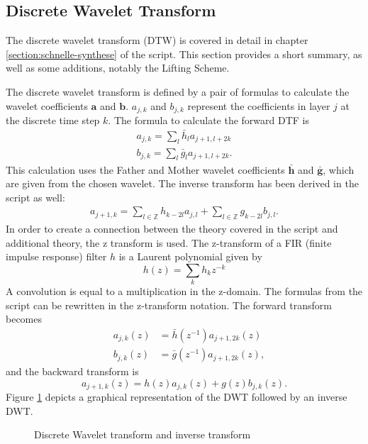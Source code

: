 \begin{refsection}
\section{Discrete Wavelet Transform}

The discrete wavelet transform (DTW) is covered in detail in chapter \ref{section:schnelle-synthese} of the script.
This section provides a short summary, as well as some additions, notably the Lifting Scheme.

The discrete wavelet transform is defined by a pair of formulas to calculate the wavelet coefficients $\bm a$ and $\bm b$.
$a_{j,k}$ and $b_{j,k}$ represent the coefficients in layer $j$ at the discrete time step $k$.
The formula to calculate the forward DTF is
\begin{align}
a_{j,k} = \sum_{l} \bar{h}_l a_{j+1,l+2k}
\\
b_{j,k} = \sum_{l} \bar{g}_l a_{j+1,l+2k} .
\end{align}
This calculation uses the Father and Mother wavelet coefficients $\bm{\bar h}$ and $\bm{\bar g}$, which are given from the chosen wavelet.
The inverse transform has been derived in the script as well: 
\begin{align}
a_{j+1,k} =
\sum_{l\in\mathbb Z}
h_{k-2l}
a_{j,l}
+
\sum_{l\in\mathbb Z}
g_{k-2l}
b_{j,l} .
\end{align}
In order to create a connection between the theory covered in the script and additional theory, the z transform is used.
The z-transform of a FIR (finite impulse response) filter $h$ is a Laurent polynomial given by
\begin{equation}
h(z) = \sum_{k} h_k z^{-k}
\end{equation}
A convolution is equal to a multiplication in the z-domain.
The formulas from the script can be rewritten in the z-transform notation.
The forward transform becomes
\begin{align}
\quad a_{j,k}(z) &= \bar h(z^{-1}) a_{j+1,2k}(z) 
\\
\quad b_{j,k}(z) &= \bar g(z^{-1}) a_{j+1,2k}(z),
\end{align}
and the backward transform is
\begin{equation}
a_{j+1,k}(z) = h(z) a_{j,k}(z) + g(z) b_{j,k}(z).
\end{equation}
Figure \ref{fpga:fig:dwt} depicts a graphical representation of the DWT followed by an inverse DWT.
\begin{figure}
	\centering
	
	\caption{Discrete Wavelet transform and inverse transform}
	\label{fpga:fig:dwt}
\end{figure}


\end{refsection}
